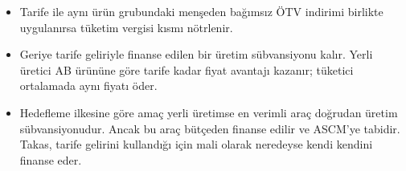\begin{itemize}
\tightlist
\item
  Tarife ile aynı ürün grubundaki menşeden bağımsız ÖTV indirimi birlikte uygulanırsa tüketim vergisi kısmı nötrlenir.
\item
  Geriye tarife geliriyle finanse edilen bir üretim sübvansiyonu kalır. Yerli üretici AB ürününe göre tarife kadar fiyat avantajı kazanır; tüketici ortalamada aynı fiyatı öder.
\item
  Hedefleme ilkesine göre amaç yerli üretimse en verimli araç doğrudan üretim sübvansiyonudur. Ancak bu araç bütçeden finanse edilir ve ASCM'ye tabidir. Takas, tarife gelirini kullandığı için mali olarak neredeyse kendi kendini finanse eder.
\end{itemize}

\begingroup\gbtablo\footnotesize

